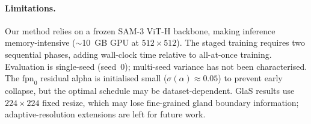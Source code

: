 
\paragraph{Limitations.}
Our method relies on a frozen SAM-3 ViT-H backbone, making inference memory-intensive
($\sim$10~GB GPU at $512{\times}512$). The staged training requires two sequential phases,
adding wall-clock time relative to all-at-once training.
Evaluation is single-seed (seed~0); multi-seed variance has not been characterised.
The $\text{fpn}_0$ residual alpha is initialised small ($\sigma(\alpha)\approx 0.05$)
to prevent early collapse, but the optimal schedule may be dataset-dependent.
GlaS results use $224{\times}224$ fixed resize, which may lose fine-grained gland boundary
information; adaptive-resolution extensions are left for future work.
